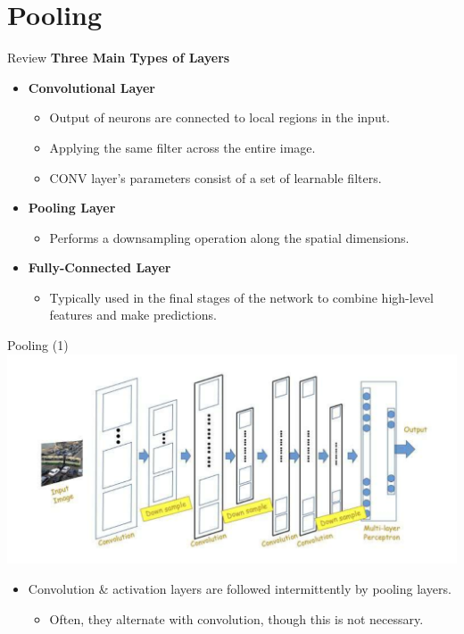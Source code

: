 \documentclass[default, aspectratio=169]{beamer}
\begin{document}
	\section{Pooling}
	\begin{frame}{Review}
		\textbf{Three Main Types of Layers}
		\begin{itemize}
			\item \textbf{Convolutional Layer}
			\begin{itemize}
				\item Output of neurons are connected to local regions in the input.
				\item Applying the same filter across the entire image.
				\item CONV layer’s parameters consist of a set of learnable filters.
			\end{itemize}
			\item \textbf{Pooling Layer}
			\begin{itemize}
				\item Performs a downsampling operation along the spatial dimensions.
			\end{itemize}
			\item \textbf{Fully-Connected Layer}
			\begin{itemize}
				\item Typically used in the final stages of the network to combine high-level features and make predictions.
			\end{itemize}
		\end{itemize}
	\end{frame}
	\begin{frame}{Pooling (1)}
		\centering
		\includegraphics[keepaspectratio, scale=0.5]{pic/pooling.png}
		\smallskip
		\begin{flushleft}
			\begin{itemize}
				\item Convolution \& activation layers are followed intermittently by pooling layers.
				\begin{itemize}
					\item Often, they alternate with convolution, though this is not necessary.
				\end{itemize}
			\end{itemize}
			
		\end{flushleft}
	\end{frame}
\end{document}
